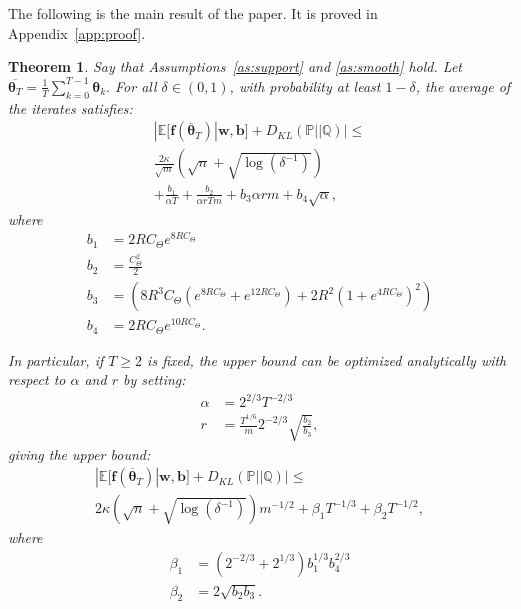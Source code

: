 \documentclass[twoside]{article}
\newtheorem{theorem}{Theorem}
\theoremstyle{definition}
\newcommand{\E}{\mathbb{E}}
\newcommand{\Prob}{\mathbb{P}}
\newcommand{\Q}{\mathbb{Q}}
\newcommand{\1}[1]{\scalebox{1.25}{$\mathds{1}$}\left[#1\right]}
\begin{document}
The following is the main result of the paper. It is proved in Appendix~\ref{app:proof}.

\begin{theorem}
\label{thm:main}
Say that Assumptions~\ref{as:support} and \ref{as:smooth} hold. Let $\overline{\bm{\theta}_T}=\frac{1}{T}\sum_{k=0}^{T-1}\bm{\theta}_k.$ For all $\delta \in (0,1)$, with probability at least $1-\delta$, the average of the iterates satisfies:
\begin{multline*}
|\E[\bm{f}(\overline{\bm{\theta}}_T)|\bm{w},\bm{b}]+D_{KL}(\Prob||\Q)|
\le \\\frac{2\kappa}{\sqrt{m}}\left(
\sqrt{n}+\sqrt{\log(\delta^{-1
})}
\right)\\+
\frac{b_1}{\alpha T}+\frac{b_2}{\alpha r T m} + b_3 \alpha r m + b_4\sqrt{\alpha},
\end{multline*}
where
\begin{align*}
b_1 &= 2RC_{\Theta}e^{8RC_{\Theta}}\\
b_2 &= \frac{C_{\Theta}^2}{2}\\
b_3 &= \left(8R^3 C_{\Theta}(e^{8R C_{\Theta}}+e^{12 R C_{\Theta}} )+2R^2(1+e^{4RC_{\Theta}})^2
\right)\\
b_4 &=2RC_{\Theta}e^{10R C_{\Theta}}.
\end{align*}

In particular, if $T\ge 2$ is fixed, the upper bound can be optimized analytically with respect to $\alpha$ and $r$ by setting:
\begin{align*}
\alpha&=2^{2/3}T^{-2/3}\\
r&=
\frac{T^{1/6}}{m } 2^{-2/3} \sqrt{\frac{b_2}{b_3}},
\end{align*}
giving the upper bound:
\begin{multline*}
|\E[\bm{f}(\overline{\bm{\theta}}_T)|\bm{w},\bm{b}]+D_{KL}(\Prob||\Q)|\le \\ 2\kappa\left(
\sqrt{n}+\sqrt{\log(\delta^{-1})}
\right)m^{-1/2}+\beta_1 T^{-1/3}+\beta_2 T^{-1/2},
\end{multline*}
where
\begin{align*}
\beta_1 &=\left(2^{-2/3}+2^{1/3}\right)b_1^{1/3}b_4^{2/3}
\\
\beta_2 &= 2\sqrt{b_2 b_3}.
\end{align*}
\end{theorem}
\end{document}
